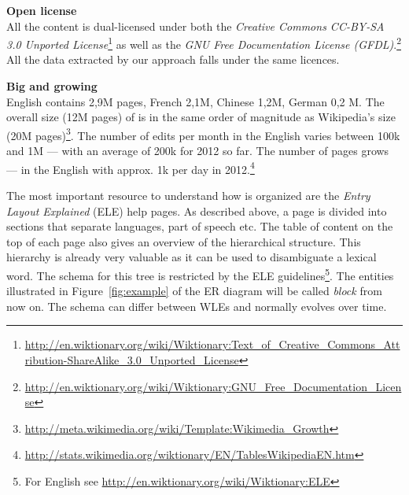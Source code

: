 \begin{compactitem}
  \item \textbf{Open license}\\
    All the content is dual-licensed under both the \textit{Creative Commons CC-BY-SA 3.0 Unported License}\footnote{\url{http://en.wiktionary.org/wiki/Wiktionary:Text_of_Creative_Commons_Attribution-ShareAlike_3.0_Unported_License}} as well as the \textit{GNU Free Documentation License (GFDL)}.\footnote{\url{http://en.wiktionary.org/wiki/Wiktionary:GNU_Free_Documentation_License}}
    All the data extracted by our approach falls under the same licences. 
  \item \textbf{Big and growing}\\
    English contains 2,9M pages, French 2,1M, Chinese 1,2M, German 0,2 M.
    The overall size (12M pages) of \wik is in the same order of magnitude as Wikipedia's size (20M pages)\footnote{\url{http://meta.wikimedia.org/wiki/Template:Wikimedia_Growth}}. 
    The number of edits per month in the English \wik varies between 100k and 1M --- with an average of 200k for 2012 so far. 
    The number of pages grows --- in the English \wik with approx. 1k per day in 2012.\footnote{\url{http://stats.wikimedia.org/wiktionary/EN/TablesWikipediaEN.htm}}
\end{compactitem}

The most important resource to understand how \wik is organized are the \textit{Entry Layout Explained} (ELE) help pages.
As described above, a page is divided into sections that separate languages, part of speech etc. 
The table of content on the top of each page also gives an overview of the hierarchical structure. 
This hierarchy is already very valuable as it can be used to disambiguate a lexical word. 
The schema for this tree is restricted by the ELE guidelines\footnote{For English see \url{http://en.wiktionary.org/wiki/Wiktionary:ELE}}. 
The entities illustrated in Figure~\ref{fig:example} of the ER diagram will be called \textit{block} from now on. 
The schema can differ between WLEs and normally evolves over time.

